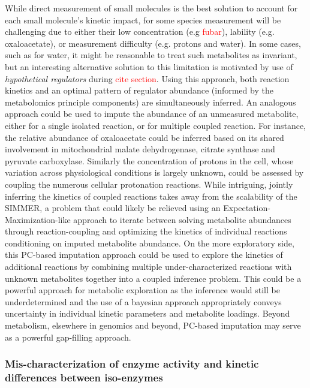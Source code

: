 While direct measurement of small molecules is the best solution to account for each small molecule's kinetic impact, for some species measurement will be challenging due to either their low concentration (e.g \textcolor{red}{fubar}), lability (e.g. oxaloacetate), or measurement difficulty (e.g. protons and water). In some cases, such as for water, it might be reasonable to treat such metabolites as invariant, but an interesting alternative solution to this limitation is motivated by use of \textit{hypothetical regulators} during \textcolor{red}{cite section}.  Using this approach, both reaction kinetics and an optimal pattern of regulator abundance (informed by the metabolomics principle components) are simultaneously inferred. An analogous approach could be used to impute the abundance of an unmeasured metabolite, either for a single isolated reaction, or for multiple coupled reaction.  For instance, the relative abundance of oxaloacetate could be inferred based on its shared involvement in mitochondrial malate dehydrogenase, citrate synthase and pyruvate carboxylase. Similarly the concentration of protons in the cell, whose variation across physiological conditions is largely unknown, could be assessed by coupling the numerous cellular protonation reactions. While intriguing, jointly inferring the kinetics of coupled reactions takes away from the scalability of the SIMMER, a problem that could likely be relieved using an Expectation-Maximization-like approach to iterate between solving metabolite abundances through reaction-coupling and optimizing the kinetics of individual reactions conditioning on imputed metabolite abundance. On the more exploratory side, this PC-based imputation approach could be used to explore the kinetics of additional reactions by combining multiple under-characterized reactions with unknown metabolites together into a coupled inference problem. This could be a powerful approach for metabolic exploration as the inference would still be underdetermined and the use of a bayesian approach appropriately conveys uncertainty in individual kinetic parameters and metabolite loadings. Beyond metabolism, elsewhere in genomics and beyond, PC-based imputation may serve as a powerful gap-filling approach.

\subsubsection{Mis-characterization of enzyme activity and kinetic differences between iso-enzymes}

